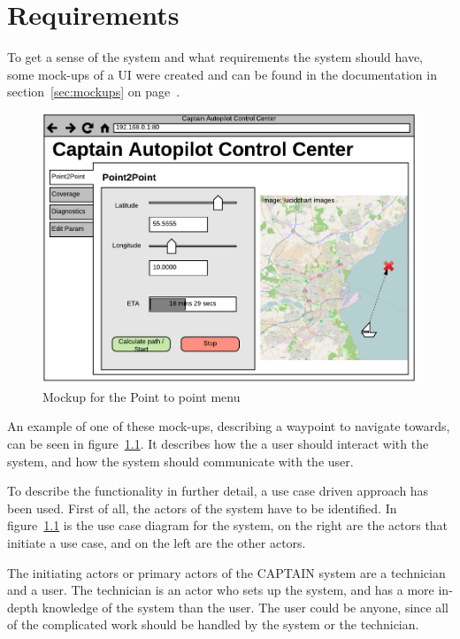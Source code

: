 \newpage
\chapter{Requirements}
To get a sense of the system and what requirements the system should have, some mock-ups of a UI were created and can be found in the documentation in section~\ref{sec:mockups} on page~\pageref{sec:mockups}.

\begin{figure}[H]
\centering
\includegraphics[width=0.7\linewidth]{../Appendix/Project/Dokumentation/Images/Requirements_specification/UI_Mockup_Point_to_point}
\caption{Mockup for the Point to point menu}
\label{fig:uimockuppointtopoint}
\end{figure}

An example of one of these mock-ups, describing a waypoint to navigate towards, can be seen in figure~\ref{fig:uimockuppointtopoint}. It describes how the a user should interact with the system, and how the system should communicate with the user.

To describe the functionality in further detail, a use case driven approach has been used. First of all, the actors of the system have to be identified. In figure~\ref{fig:uimockuppointtopoint} is the use case diagram for the system, on the right are the actors that initiate a use case, and on the left are the other actors.

The initiating actors or primary actors of the CAPTAIN system are a technician and a user. The technician is an actor who sets up the system, and has a more in-depth knowledge of the system than the user. The user could be anyone, since all of the complicated work should be handled by the system or the technician. 

